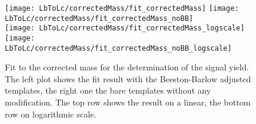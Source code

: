 \begin{figure}[hptb]
	\centering
	\texttt{[image: LbToLc/correctedMass/fit\_correctedMass]}
	\texttt{[image: LbToLc/correctedMass/fit\_correctedMass\_noBB]} \\
	\texttt{[image: LbToLc/correctedMass/fit\_correctedMass\_logscale]}
	\texttt{[image: LbToLc/correctedMass/fit\_correctedMass\_noBB\_logscale]}
	\caption{Fit to the \pKpi\mun corrected mass for the determination of the \LbToLcmunu signal yield. The left plot shows the fit result with the Beeston-Barlow adjusted templates, the right one the bare templates without any modification. The top row shows the result on a linear, the bottom row on logarithmic scale.}
	\label{fig:correctedMass_fit}
\end{figure}

